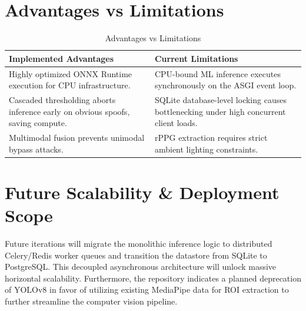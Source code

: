 \documentclass[12pt, a4paper]{report}
\begin{document}
\section{Advantages vs Limitations}
\begin{table}[H]
\centering
\caption{Advantages vs Limitations}
\begin{tabularx}{\textwidth}{|X|X|}
\hline
\textbf{Implemented Advantages} & \textbf{Current Limitations} \\
\hline
Highly optimized ONNX Runtime execution for CPU infrastructure. & CPU-bound ML inference executes synchronously on the ASGI event loop. \\
Cascaded thresholding aborts inference early on obvious spoofs, saving compute. & SQLite database-level locking causes bottlenecking under high concurrent client loads. \\
Multimodal fusion prevents unimodal bypass attacks. & rPPG extraction requires strict ambient lighting constraints. \\
\hline
\end{tabularx}
\end{table}

\section{Future Scalability \& Deployment Scope}
Future iterations will migrate the monolithic inference logic to distributed Celery/Redis worker queues and transition the datastore from SQLite to PostgreSQL. This decoupled asynchronous architecture will unlock massive horizontal scalability. Furthermore, the repository indicates a planned deprecation of YOLOv8 in favor of utilizing existing MediaPipe data for ROI extraction to further streamline the computer vision pipeline.
\end{document}
